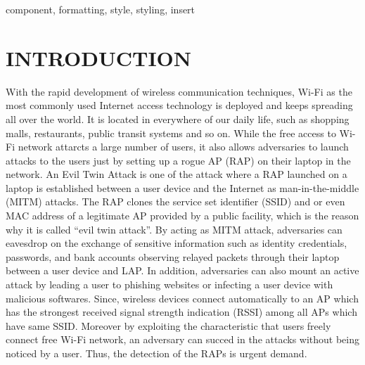 \documentclass[conference]{IEEEtran}
\begin{document}
\begin{IEEEkeywords}
component, formatting, style, styling, insert
\end{IEEEkeywords}

\section{INTRODUCTION}
With the rapid development of wireless communication techniques, Wi-Fi as the most commonly used Internet access technology is deployed and keeps spreading all over the world.
It is located in everywhere of our daily life, such as shopping malls, restaurants, public transit systems and so on.
While the free access to Wi-Fi network attarcts a large number of users, it also allows adversaries to launch attacks to the users just by setting up a rogue AP (RAP) on their laptop in the network.
An Evil Twin Attack is one of the attack where a RAP launched on a laptop is established between a user device and the Internet as man-in-the-middle (MITM) attacks.
The RAP clones the service set identifier (SSID) and or even MAC address of a legitimate AP provided by a public facility, which is the reason why it is called ``evil twin attack''.
By acting as MITM attack, adversaries can eavesdrop on the exchange of sensitive information such as identity credentials, passwords, and bank accounts observing relayed packets through their laptop between a user device and LAP.
In addition, adversaries can also mount an active attack by leading a user to phishing websites or infecting a user device with malicious softwares.
Since, wireless devices connect automatically to an AP which has the strongest received signal strength indication (RSSI) among all APs which have same SSID.
Moreover by exploiting the characteristic that users freely connect free Wi-Fi network,  an adversary can succed in the attacks without being noticed by a user.
Thus, the detection of the RAPs is urgent demand.
\end{document}
